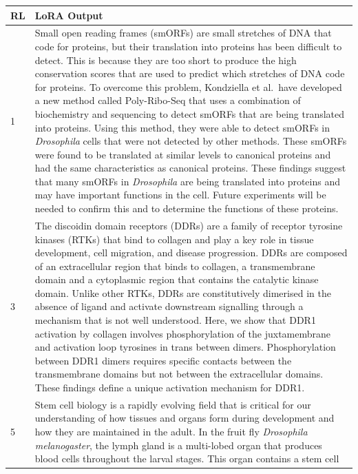 \begin{table}[h]
\centering
\scriptsize

\begin{tabular}{l|p{}}
\textbf{RL} & \textbf{LoRA Output} \\\hline
1 & Small open reading frames (smORFs) are small stretches of DNA that code for proteins,
but their translation into proteins has been difficult to detect. This is because they are
too short to produce the high conservation scores that are used to predict which stretches
of DNA code for proteins. To overcome this problem, Kondziella et al.\ have developed a
new method called Poly-Ribo-Seq that uses a combination of biochemistry and sequencing to
detect smORFs that are being translated into proteins. Using this method, they were able
to detect smORFs in \textit{Drosophila} cells that were not detected by other methods.
These smORFs were found to be translated at similar levels to canonical proteins and had
the same characteristics as canonical proteins. These findings suggest that many smORFs in
\textit{Drosophila} are being translated into proteins and may have important functions in
the cell. Future experiments will be needed to confirm this and to determine the functions
of these proteins. \\\hline
3 & The discoidin domain receptors (DDRs) are a family of receptor tyrosine kinases (RTKs)
that bind to collagen and play a key role in tissue development, cell migration, and
disease progression. DDRs are composed of an extracellular region that binds to collagen,
a transmembrane domain and a cytoplasmic region that contains the catalytic kinase domain.
Unlike other RTKs, DDRs are constitutively dimerised in the absence of ligand and activate
downstream signalling through a mechanism that is not well understood. Here, we show that
DDR1 activation by collagen involves phosphorylation of the juxtamembrane and activation
loop tyrosines in trans between dimers. Phosphorylation between DDR1 dimers requires
specific contacts between the transmembrane domains but not between the extracellular
domains. These findings define a unique activation mechanism for DDR1. \\\hline
5 & Stem cell biology is a rapidly evolving field that is critical for our understanding of
how tissues and organs form during development and how they are maintained in the adult.
In the fruit fly \textit{Drosophila melanogaster}, the lymph gland is a multi-lobed organ
that produces blood cells throughout the larval stages. This organ contains a stem cell

\end{tabular}
\end{table}
